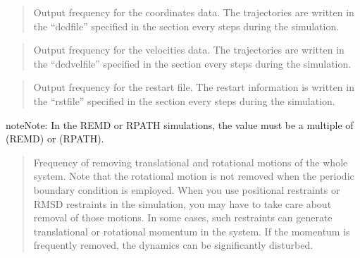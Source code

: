 \documentclass[a4paper,11pt,oneside,english]{sphinxmanual}
\begin{document}
 
\begin{quote}


Output frequency for the coordinates data. The trajectories are written
in the “dcdfile” specified in the \sphinxstylestrong{{[}OUTPUT{]}} section
every  steps during the simulation.
\end{quote}

 
\begin{quote}


Output frequency for the velocities data. The trajectories are written
in the “dcdvelfile” specified in the \sphinxstylestrong{{[}OUTPUT{]}} section
every  steps during the simulation.
\end{quote}

 
\begin{quote}


Output frequency for the restart file. The restart information is written
in the “rstfile” specified in the \sphinxstylestrong{{[}OUTPUT{]}} section
every  steps during the simulation.
\end{quote}

\begin{sphinxadmonition}{note}{Note:}
In the REMD or RPATH simulations, the value must be a multiple of  (REMD) or  (RPATH).
\end{sphinxadmonition}

 
\begin{quote}


Frequency of removing translational and rotational motions of the whole system.
Note that the rotational motion is not removed when the periodic boundary condition is employed.
When you use positional restraints or RMSD restraints in the simulation,
you may have to take care about removal of those motions.
In some cases, such restraints can generate translational or rotational momentum in the system.
If the momentum is frequently removed, the dynamics can be significantly disturbed.
\end{quote}
\end{document}
